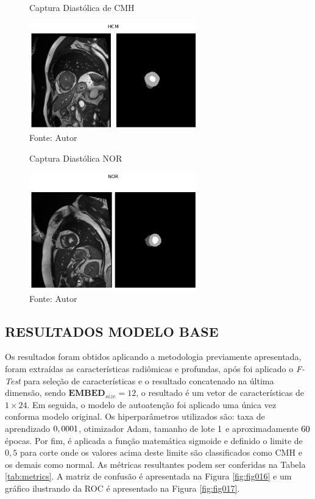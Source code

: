 \begin{figure}[h!]
    \caption{Captura Diastólica de CMH}
    \centering
    \includegraphics[width=0.65\textwidth]{figures/fig019.png}
    \caption*{Fonte: Autor}
    \label{fig:fig019}
\end{figure}

\begin{figure}[h!]
    \centering
    \caption{Captura Diastólica NOR}
    \includegraphics[width=0.65\textwidth]{figures/fig020.png}
    \caption*{Fonte: Autor}
    \label{fig:fig020}
\end{figure}

\subsection{RESULTADOS MODELO BASE}
\label{subsec:resultados_acdc_base}

Os resultados foram obtidos aplicando a metodologia previamente apresentada, foram extraídas as características radiômicas e profundas, após foi aplicado o \textit{F-Test} para seleção de características e o resultado concatenado na última dimensão, sendo $\textbf{EMBED}_{size} = 12$, o resultado é um vetor de características de $1\times24$. Em seguida, o modelo de autoatenção foi aplicado uma única vez conforma modelo original. Os hiperparâmetros utilizados são: taxa de aprendizado $0,0001$, otimizador \gls{Adam}, tamanho de lote $1$ e aproximadamente $60$ épocas. Por fim, é aplicada a função matemática sigmoide e definido o limite de $0,5$ para corte onde os valores acima deste limite são classificados como \gls{CMH} e os demais como normal. As métricas resultantes podem ser conferidas na Tabela \ref{tab:metrics}. A matriz de confusão é apresentada na Figura \ref{fig:fig016} e um gráfico ilustrando da \gls{ROC} é apresentado na Figura \ref{fig:fig017}.
\newline

